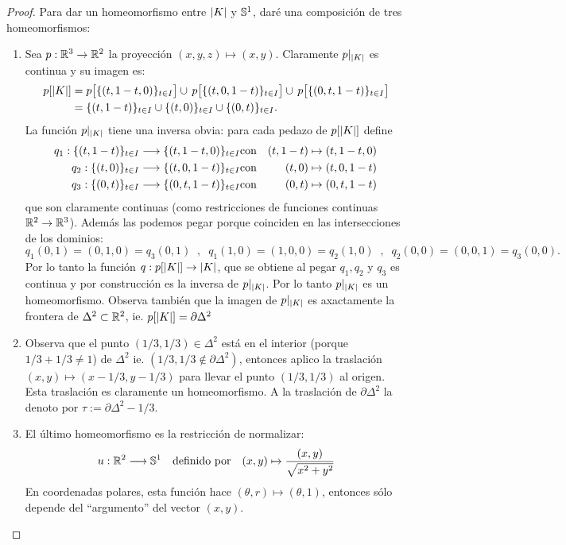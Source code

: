 \begin{proof}
	Para dar un homeomorfismo entre $\left| K \right|$ y $\mathbb{S}^1$, dar\'e una composici\'on de tres homeomorfismos:
	\begin{enumerate}
		\item Sea $p:\mathbb{R}^3\rightarrow\mathbb{R}^2$ la proyecci\'on $(x,y,z)\mapsto(x,y)$. Claramente $p|_{\left| K \right|}$ es continua
			y su imagen es:
			\begin{align*}
				p[\left| K \right|]&=
				p\big[\{(t,1-t,0)\}_{t\in I}\big] \cup\, p\big[\{(t,0,1-t)\}_{t\in I}\big] \cup\, p\big[\{(0,t,1-t)\}_{t\in I}\big] \\ &=
				\{(t,1-t)\}_{t\in I} \cup \{(t,0)\}_{t\in I} \cup \{(0,t)\}_{t\in I}.
			\end{align*}
			La funci\'on $p|_{\left| K \right|}$ tiene una inversa obvia: para cada pedazo de $p[\left| K \right|]$ define
			\begin{eqnarray*}
				q_1:\{(t,1-t)\}_{t\in I} \longrightarrow \{(t,1-t,0)\}_{t\in I} &\text{con}& (t,1-t)\mapsto (t,1-t,0) \\
				q_2:\{(t,0)\}_{t\in I} \longrightarrow \{(t,0,1-t)\}_{t\in I} &\text{con}& (t,0)\mapsto (t,0,1-t) \\
				q_3:\{(0,t)\}_{t\in I} \longrightarrow \{(0,t,1-t)\}_{t\in I} &\text{con}& (0,t)\mapsto (0,t,1-t)
			\end{eqnarray*}
			que son claramente continuas (como restricciones de funciones continuas $\mathbb{R}^2\rightarrow\mathbb{R}^3$).
			Adem\'as las podemos pegar porque coinciden en las intersecciones de los dominios:
			\[
				q_1(0,1)=(0,1,0)=q_3(0,1) \;\;,\;\; q_1(1,0)=(1,0,0)=q_2(1,0) \;\;,\;\; q_2(0,0)=(0,0,1)=q_3(0,0).
			\]
			Por lo tanto la funci\'on $q:p[\left| K \right|]\rightarrow\left| K \right|$, que se obtiene al pegar $q_1,q_2$ y $q_3$ es continua
			y por construcci\'on es la inversa de $p|_{\left| K \right|}$. Por lo tanto $p|_{\left| K \right|}$ es un homeomorfismo.
			Observa tambi\'en que la imagen de $p|_{\left| K \right|}$ es axactamente la frontera de $\Delta^2\subset\mathbb{R}^2$,
			ie. $p[\left| K \right|]=\partial\Delta^2$

		\item Observa que el punto $(1/3,1/3)\in\Delta^2$ est\'a en el interior (porque $1/3+1/3\neq 1$) de $\Delta^2$ ie.
			$(1/3,1/3\not\in\partial\Delta^2)$, entonces aplico la traslaci\'on $(x,y)\mapsto(x-1/3,y-1/3)$ para llevar
			el punto $(1/3,1/3)$ al origen. Esta traslaci\'on es claramente un homeomorfismo. A la traslaci\'on
			de $\partial\Delta^2$ la denoto por $\tau:=\partial\Delta^2-1/3$.

		\item El \'ultimo homeomorfismo es la restricci\'on de normalizar:
			\[
				u:\mathbb{R}^2\longrightarrow\mathbb{S}^1 \quad\text{definido por}\quad (x,y)\mapsto\frac{(x,y)}{\sqrt{x^2+y^2}}
			\]
			En coordenadas polares, esta funci\'on hace $(\theta,r)\mapsto(\theta,1)$, entonces s\'olo depende
			del ``argumento'' del vector $(x,y)$.


\end{enumerate}
\end{proof}

